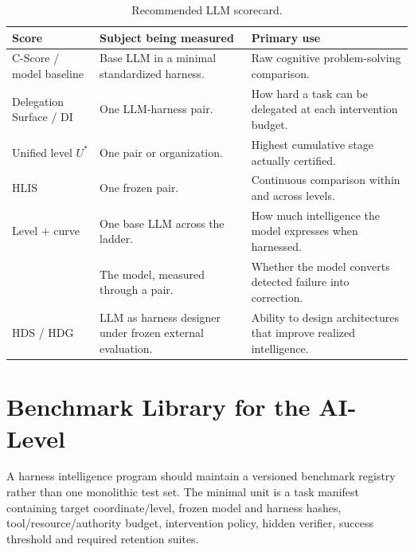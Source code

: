 \begin{table}[!htbp]
\centering\small
\begin{tabularx}{\textwidth}{@{}lYY@{}}
\toprule
Score & Subject being measured & Primary use \\
\midrule
C-Score / model baseline & Base LLM in a minimal standardized harness. & Raw cognitive problem-solving comparison. \\
Delegation Surface / DI & One LLM-harness pair. & How hard a task can be delegated at each intervention budget. \\
Unified level $U^{*}$ & One pair or organization. & Highest cumulative stage actually certified. \\
HLIS & One frozen pair. & Continuous comparison within and across levels. \\
Level + curve & One base LLM across the ladder. & How much intelligence the model expresses when harnessed. \\
\rhov{} & The model, measured through a pair. & Whether the model converts detected failure into correction. \\
HDS / HDG & LLM as harness designer under frozen external evaluation. & Ability to design architectures that improve realized intelligence. \\
\bottomrule
\end{tabularx}
\caption{Recommended LLM scorecard.}
\label{tab:scorecard}
\end{table}

\section{Benchmark Library for the AI-Level}

A harness intelligence program should maintain a versioned benchmark registry rather than one monolithic test set. The minimal unit is a task manifest containing target coordinate/level, frozen model and harness hashes, tool/resource/authority budget, intervention policy, hidden verifier, success threshold and required retention suites.

